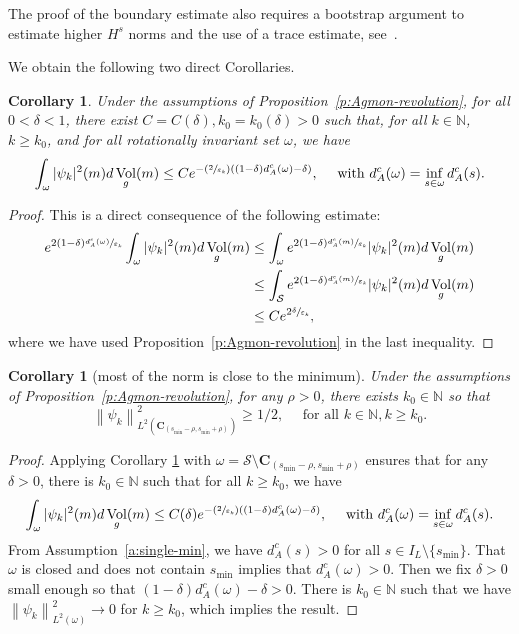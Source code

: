 \documentclass[JEP,XML,SOM,Unicode]{cedram}
\newcommand{\Psfrac}[2]{(\sfrac{#1}{#2})}
\newtheorem{corollary}[lemma]{Corollary}
\theoremstyle{definition}
\newcommand{\calS}{\ensuremath{\mathcal S}}
\newcommand{\mb}[1]{\ensuremath{\mathbb{#1}}}
\newcommand{\N}{{\mb{N}}}
\DeclareMathOperator{\Vol}{Vol}
\newcommand\bnp{\begin{proof}}
\newcommand\enp{\end{proof}}
\newcommand\nor[2]{\left\|#1\right\|_{#2}}
\newcommand{\ce}{c}
\let\e\varepsilon
\newcommand\CO[1]{\boldsymbol{C}_{\!#1}}
\begin{document}
The proof of the boundary estimate also requires a bootstrap argument to estimate higher $H^s$ norms and the use of a trace estimate, see~\cite[Prop.\,3.3.1 \&~3.3.4]{Helffer:booksemiclassic}.

We obtain the following two direct Corollaries.
\begin{corollary}
\label{coragmonfaible}
Under the assumptions of Proposition~\ref{p:Agmon-revolution}, for all $0<\delta< 1$, there exist $C=C(\delta),k_0=k_0(\delta)>0$ such that, for all $k \in \N$, $k \geq k_0$, and for all rotationally invariant set $\omega$, we have
\[
\int_{\omega} |\psi_k|^2(m) d\Vol_g(m)
\leq C e^{-\Psfrac{2}{\e_k} ((1-\delta)d_A^{\ce}(\omega) - \delta) }, \quad \text{ with } d_A^{\ce}(\omega) = \inf_{s\in \omega} d_A^{\ce}(s).
\]
\end{corollary}
\bnp
This is a direct consequence of the following estimate:
\begin{align*}
e^{2(1-\delta)\sfrac{ d_A^{\ce}(\omega)}{\e_k}} \int_{\omega} |\psi_k|^2(m) d\Vol_g(m) & \leq\int_{\omega} e^{2(1-\delta)\sfrac{ d_A^{\ce}(m)}{\e_k}} |\psi_k|^2(m) d\Vol_g(m) \\
& \leq \int_{\calS} e^{2(1-\delta)\sfrac{ d_A^{\ce}(m)}{\e_k}} |\psi_k|^2(m) d\Vol_g(m)\\
&\leq C e^{2\sfrac{\delta}{\e_k}},
\end{align*}
where we have used Proposition~\ref{p:Agmon-revolution} in the last inequality.
\enp
\begin{corollary}[most of the norm is close to the minimum]
\label{corpresx0}
Under the assumptions of Proposition~\ref{p:Agmon-revolution}, for any $\rho>0$, there exists $k_0\in \N$ so that
\[
\nor{\psi_k}{L^2(\CO{(s_{\min}-\rho, s_{\min} +\rho)})}^2\geq 1/2, \quad \text{ for all } k\in \N, k\geq k_0.
\]
\end{corollary}
\bnp
Applying Corollary \ref{coragmonfaible} with $\omega=\mathcal{S}\setminus\CO{(s_{\min}-\rho, s_{\min} +\rho)}$ ensures that for any $\delta>0$, there is $k_0\in \N$ such that for all $k\geq k_0$, we have
\[
\int_{\omega} |\psi_k|^2(m) d\Vol_g(m)
\leq C(\delta) e^{-\Psfrac{2}{\e_k} ((1-\delta)d_A^{\ce}(\omega) - \delta) }, \quad \text{ with } d_A^{\ce}(\omega) = \inf_{s\in \omega} d_A^{\ce}(s).
\]
From Assumption~\ref{a:single-min}, we have $d_A^{\ce}(s)>0$ for all $s \in I_L\setminus \{s_{\min}\}$. That $\omega$ is closed and does not contain $s_{\min}$ implies that $d_A^{\ce}(\omega)>0$.
Then we fix $\delta>0$ small enough so that $(1-\delta)d_A^{\ce}(\omega) - \delta>0$. There is $k_0\in \N$ such that we have $\nor{\psi_k}{L^2(\omega)}^2 \to 0$ for $k \geq k_0$, which implies the result.
\enp
\end{document}
